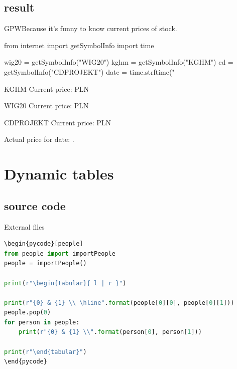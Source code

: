 \documentclass[
aspectratio=1610,
hyperref={pdfpagemode=FullScreen},
english,
usenames,
dvipsnames
]
{beamer} %
\begin{document}
\subsection{result}
\begin{frame}[fragile]{GPW}{Because it's funny to know current prices of stock.}
\begin{pycode}[internet]
from internet import getSymbolInfo
import time

wig20 = getSymbolInfo("WIG20")
kghm = getSymbolInfo("KGHM")
cd = getSymbolInfo("CDPROJEKT")
date = time.strftime("%
\end{pycode}


\begin{exampleblock}{KGHM}
Current price:  PLN
\end{exampleblock}

\begin{exampleblock}{WIG20}
Current price:  PLN
\end{exampleblock}

\begin{exampleblock}{CDPROJEKT}
Current price:  PLN
\end{exampleblock}

Actual price for date: .

\onslide
\end{frame}

\section{Dynamic tables}
\subsection{source code}
\begin{frame}[fragile]{External files}
\begin{lstlisting}[language=python]
\begin{pycode}[people]
from people import importPeople
people = importPeople()	

print(r"\begin{tabular}{ l | r }")

print(r"{0} & {1} \\ \hline".format(people[0][0], people[0][1]))
people.pop(0)
for person in people:
	print(r"{0} & {1} \\".format(person[0], person[1]))
	
print(r"\end{tabular}")
\end{pycode}

\end{lstlisting}
\end{frame}
\end{document}
